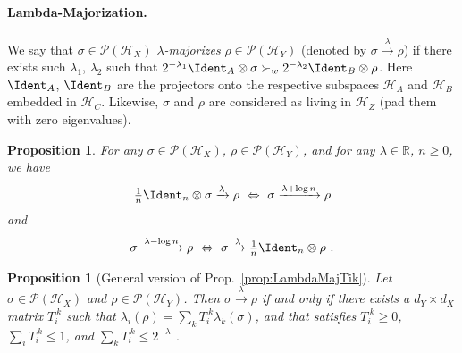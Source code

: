 \documentclass[11pt,a4paper]{article}
\theoremstyle{plain}
\newtheorem{prop}[thm]{Proposition}
\def\Hs{\mathscr{H}}%
\newcommand{\lambdamaj}[1]{\xrightarrow{#1}}
\newcommand{\POps}{\mathscr{P}}
\begin{document}
\paragraph{Lambda-Majorization.} We say that $\sigma\in\POps(\Hs_X)$ {\em $\lambda$-majorizes}
$\rho\in\POps(\Hs_Y)$ (denoted by $\sigma\lambdamaj\lambda\rho$) if there exists such
$\lambda_1$, $\lambda_2$ such that
$2^{-\lambda_1}\Ident_A\otimes\sigma \succ_w 2^{-\lambda_2}\Ident_B\otimes\rho$.
Here $\Ident_A$, $\Ident_B$ are the projectors onto the respective subspaces $\Hs_A$ and $\Hs_B$
embedded in $\Hs_C$. Likewise, $\sigma$ and $\rho$ are considered as living in $\Hs_Z$ (pad them with zero
eigenvalues).

\begin{prop}
  \label{prop:LambdaMajMoveIdentitiesAround}
  For any $\sigma\in\POps(\Hs_X)$, $\rho\in\POps(\Hs_Y)$, and for any $\lambda\in\mathbb{R}$, $n\geqslant 0$, we have
  \begin{align*}
    {\textstyle\frac1n}\Ident_n\otimes\sigma\lambdamaj\lambda\rho  ~\Leftrightarrow~
    \sigma\lambdamaj{\lambda+\log n} \rho
  \end{align*}
  and
  \begin{align*}
    \sigma\lambdamaj{\lambda-\log n} \rho  ~\Leftrightarrow~
    \sigma\lambdamaj\lambda {\textstyle\frac1n}\Ident_n\otimes\rho\ .
  \end{align*}
\end{prop}

\begin{prop}[General version of Prop.~\ref{prop:LambdaMajTik}]
  \label{prop:LambdaMajTikFormal}
  Let $\sigma\in\POps(\Hs_X)$ and $\rho\in\POps(\Hs_Y)$. Then $\sigma\lambdamaj\lambda\rho$ if
  and only if there exists a $d_Y \times d_X$ matrix $T_i^{~k}$ such that
  $\lambda_i(\rho) = \sum_k T_i^{~k} \lambda_k(\sigma)$, and that satisfies
  $T_i^{~k}\geqslant 0$,
  $\sum_i T_i^{~k} \leqslant 1$, and
  $\sum_k T_i^{~k} \leqslant 2^{-\lambda}$ .
\end{prop}
\end{document}
